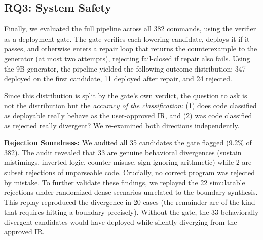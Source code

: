 \documentclass[sigconf,nonacm,anonymous,review]{acmart}
\begin{document}
\subsection{RQ3: System Safety}

Finally, we evaluated the full pipeline across all 382 commands, using the verifier as a deployment gate.
The gate verifies each lowering candidate, deploys it if it passes, and otherwise enters a repair loop that returns the counterexample to the generator (at most two attempts), rejecting fail-closed if repair also fails. %
Using the 9B generator, the pipeline yielded the following outcome distribution: 347 deployed on the first candidate, 11 deployed after repair, and 24 rejected.

Since this distribution is split by the gate's own verdict, the question to ask is not the distribution but the \emph{accuracy of the classification}: (1) does code classified as deployable really behave as the user-approved IR, and (2) was code classified as rejected really divergent? We re-examined both directions independently.

\textbf{Rejection Soundness:} %
We audited all 35 candidates the gate flagged (9.2\% of 382). The audit revealed that 33 are genuine behavioral divergences (sustain mistimings, inverted logic, counter misuse, sign-ignoring arithmetic) while 2 are subset rejections of unparseable code. Crucially, no correct program was rejected by mistake. To further validate these findings, we replayed the 22 simulatable rejections under randomized dense scenarios unrelated to the boundary synthesis. This replay reproduced the divergence in 20 cases (the remainder are of the kind that requires hitting a boundary precisely). Without the gate, the 33 behaviorally divergent candidates would have deployed while silently diverging from the approved IR.
\end{document}
